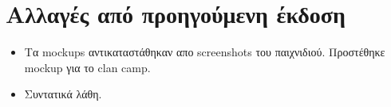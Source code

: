 \section*{Αλλαγές από προηγούμενη έκδοση}


\begin{itemize}

\item Τα mockups αντικαταστάθηκαν απο screenshots του παιχνιδιού. Προστέθηκε mockup για το clan camp.

\item Συντατικά λάθη.

\end{itemize}

\clearpage